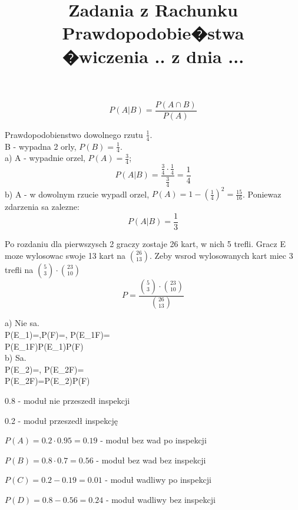 \documentclass[fleqn]{article}
\begin{document}
\title{Zadania z Rachunku Prawdopodobie�stwa \\ �wiczenia .. z dnia ...}
\date{}
\medskip


\[P(A|B) = \frac{P(A \cap B)}{P(A)}\]

Prawdopodobienstwo dowolnego rzutu $\frac{1}{4}$. \\
B - wypadna 2 orly, $P(B) = \frac{1}{4}$. \\
a) A - wypadnie orzel, $P(A) = \frac{3}{4}$; \\
   \[P(A|B) = \frac{\frac{3}{4} \cdot \frac{1}{4}}{\frac{3}{4}} = \frac{1}{4}\]
b) A - w dowolnym rzucie wypadl orzel, $P(A) = 1 - (\frac{1}{4})^2 =    \frac{15}{16}$. Poniewaz zdarzenia sa zalezne: \\
   \[P(A|B) =\frac{1}{3}\]

\medskip

\medskip

Po rozdaniu dla pierwszysch 2 graczy zostaje 26 kart, w nich 5 trefli. Gracz E moze wylosowac swoje 13 kart na ${26 \choose 13}$. Zeby wsrod wylosowanych kart miec 3 trefli na ${5 \choose 3}\cdot{23 \choose 10}$\\
\[P = \frac{{5 \choose 3}\cdot{23 \choose 10}}{{26 \choose 13}}\]

\medskip
{}
\medskip

\medskip

a) Nie sa.\\
P(E_{1})=,P(F)=, P(E_{1}\cap F)=\\ P(E_{1}\cap F)\neq P(E_{1})P(F)\\
b) Sa.\\
P(E_{2})=, P(E_{2}\cap F)=\\
P(E_{2}\cap F)=P(E_{2})P(F)\\

\medskip
{}
\medskip

0.8 - moduł nie przeszedł inspekcji

0.2 - moduł przeszedł inspekcję

$P(A) = 0.2 \cdot 0.95 = 0.19$ - moduł bez wad po inspekcji

$P(B) = 0.8 \cdot 0.7 = 0.56$ - moduł bez wad bez inspekcji

$P(C) = 0.2 - 0.19 = 0.01$ - moduł wadliwy po inspekcji

$P(D) = 0.8 - 0.56 = 0.24$ - moduł wadliwy bez inspekcji
\end{document}
